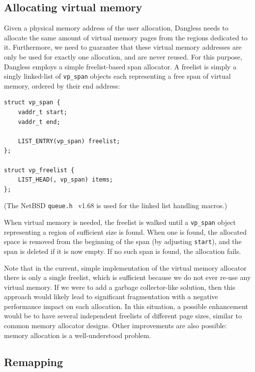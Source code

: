 \subsection{Allocating virtual memory}

Given a physical memory address of the user allocation, Dangless needs to allocate the same amount of virtual memory pages from the regions dedicated to it. Furthermore, we need to guarantee that these virtual memory addresses are only be used for exactly one allocation, and are never reused. For this purpose, Dangless employs a simple freelist-based span allocator. A freelist is simply a singly linked-list of \lstinline!vp_span! objects each representing a free span of virtual memory, ordered by their end address:

\begin{lstlisting}
struct vp_span {
	vaddr_t start;
	vaddr_t end;
	
	LIST_ENTRY(vp_span) freelist;
};

struct vp_freelist {
	LIST_HEAD(, vp_span) items;
};
\end{lstlisting}

(The NetBSD \texttt{queue.h}~\cite{netbsd-queue-ref} v1.68 is used for the linked list handling macros.)

When virtual memory is needed, the freelist is walked until a \lstinline!vp_span! object representing a region of sufficient size is found. When one is found, the allocated space is removed from the beginning of the span (by adjusting \lstinline!start!), and the span is deleted if it is now empty. If no such span is found, the allocation fails.

Note that in the current, simple implementation of the virtual memory allocator there is only a single freelist, which is sufficient because we do not ever re-use any virtual memory. If we were to add a garbage collector-like solution, then this approach would likely lead to significant fragmentation with a negative performance impact on each allocation. In this situation, a possible enhancement would be to have several independent freelists of different page sizes, similar to common memory allocator designs. Other improvements are also possible: memory allocation is a well-understood problem.

\subsection{Remapping}

